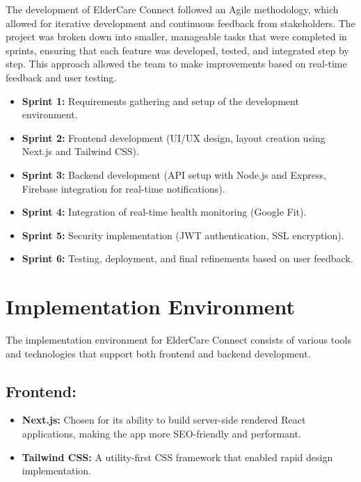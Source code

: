The development of ElderCare Connect followed an Agile methodology, which allowed for iterative development and continuous feedback from stakeholders\cite{agile_manifesto}. The project was broken down into smaller, manageable tasks that were completed in sprints, ensuring that each feature was developed, tested, and integrated step by step\cite{scrum_guide}. This approach allowed the team to make improvements based on real-time feedback and user testing.

\begin{itemize}
    \item \textbf{Sprint 1:} Requirements gathering and setup of the development environment.
    \item \textbf{Sprint 2:} Frontend development (UI/UX design, layout creation using Next.js and Tailwind CSS)\cite{nextjs_docs}.
    \item \textbf{Sprint 3:} Backend development (API setup with Node.js and Express, Firebase integration for real-time notifications)\cite{nextjs_docs}.
    \item \textbf{Sprint 4:} Integration of real-time health monitoring (Google Fit)\cite{google_fit}.
    \item \textbf{Sprint 5:} Security implementation (JWT authentication, SSL encryption)\cite{jwt_handbook}.
    \item \textbf{Sprint 6:} Testing, deployment, and final refinements based on user feedback\cite{firebase_docs}.
\end{itemize}

\section{Implementation Environment}

The implementation environment for ElderCare Connect consists of various tools and technologies that support both frontend and backend development.

\subsection*{Frontend:}
\begin{itemize}
    \item \textbf{Next.js:} Chosen for its ability to build server-side rendered React applications, making the app more SEO-friendly and performant\cite{nextjs_docs}.
    \item \textbf{Tailwind CSS:} A utility-first CSS framework that enabled rapid design implementation\cite{tailwind_docs}.
\end{itemize}

